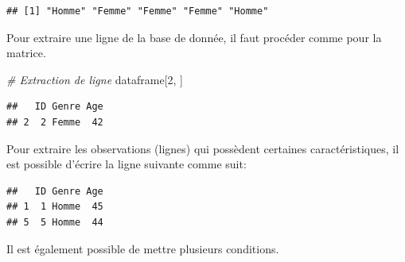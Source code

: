 \documentclass[
]{book}
\newenvironment{Shaded}{\begin{snugshade}}{\end{snugshade}}
\newcommand{\CommentTok}[1]{\textcolor[rgb]{0.56,0.35,0.01}{\textit{#1}}}
\newcommand{\DecValTok}[1]{\textcolor[rgb]{0.00,0.00,0.81}{#1}}
\newcommand{\NormalTok}[1]{#1}
\newcommand{\SpecialCharTok}[1]{\textcolor[rgb]{0.81,0.36,0.00}{\textbf{#1}}}
\newcommand{\StringTok}[1]{\textcolor[rgb]{0.31,0.60,0.02}{#1}}
\begin{document}
\begin{Shaded}
\end{Shaded}

\begin{verbatim}
## [1] "Homme" "Femme" "Femme" "Femme" "Homme"
\end{verbatim}

Pour extraire une ligne de la base de donnée, il faut procéder comme pour la matrice.

\begin{Shaded}
\begin{Highlighting}[]
\CommentTok{\# Extraction de ligne}
\NormalTok{dataframe[}\DecValTok{2}\NormalTok{, ]}
\end{Highlighting}
\end{Shaded}

\begin{verbatim}
##   ID Genre Age
## 2  2 Femme  42
\end{verbatim}

Pour extraire les observations (lignes) qui possèdent certaines caractéristiques, il est possible d'écrire la ligne suivante comme suit:

\begin{Shaded}
\end{Shaded}

\begin{verbatim}
##   ID Genre Age
## 1  1 Homme  45
## 5  5 Homme  44
\end{verbatim}

Il est également possible de mettre plusieurs conditions.

\begin{Shaded}
\end{Shaded}
\end{document}
